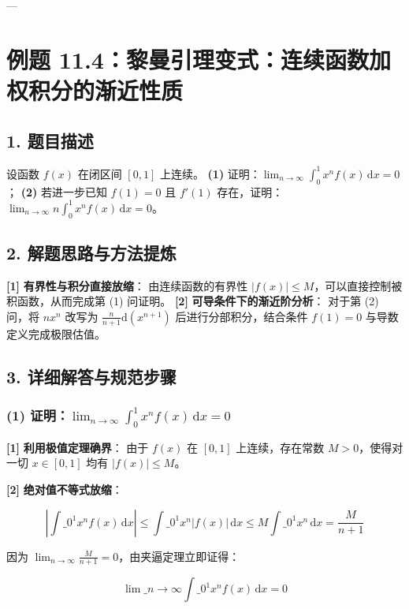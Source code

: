 \documentclass[11pt,a4paper,UTF8]{ctexart}
\begin{document}
---


\section{例题 11.4：黎曼引理变式：连续函数加权积分的渐近性质}


\subsection{1. 题目描述}
设函数 $f(x)$ 在闭区间 $[0, 1]$ 上连续。
\textbf{(1)}  证明：$\lim_{n \to \infty} \int_0^1 x^n f(x)\,\mathrm{d}x = 0$；
\textbf{(2)}  若进一步已知 $f(1) = 0$ 且 $f'(1)$ 存在，证明：$\lim_{n \to \infty} n \int_0^1 x^n f(x)\,\mathrm{d}x = 0$。


\subsection{2. 解题思路与方法提炼}
\begin{solbox}[分步推导与答题规范]
\textbf{[1]}  \textbf{有界性与积分直接放缩}：
由连续函数的有界性 $|f(x)| \le M$，可以直接控制被积函数，从而完成第 (1) 问证明。
\textbf{[2]}  \textbf{可导条件下的渐近阶分析}：
对于第 (2) 问，将 $n x^n$ 改写为 $\frac{n}{n+1}\mathrm{d}(x^{n+1})$ 后进行分部积分，结合条件 $f(1)=0$ 与导数定义完成极限估值。
\end{solbox}


\subsection{3. 详细解答与规范步骤}


\subsubsection{(1) 证明：$\lim_{n \to \infty} \int_0^1 x^n f(x)\,\mathrm{d}x = 0$}
\begin{solbox}[分步推导与答题规范]
\textbf{[1]}  \textbf{利用极值定理确界}：
由于 $f(x)$ 在 $[0, 1]$ 上连续，存在常数 $M > 0$，使得对一切 $x \in [0, 1]$ 均有 $|f(x)| \le M$。

\textbf{[2]}  \textbf{绝对值不等式放缩}：

\begin{equation*}
\left| \int\_0^1 x^n f(x)\,\mathrm{d}x \right| \le \int\_0^1 x^n |f(x)|\,\mathrm{d}x \le M \int\_0^1 x^n\,\mathrm{d}x = \frac{M}{n+1}
\end{equation*}

因为 $\lim_{n \to \infty} \frac{M}{n+1} = 0$，由夹逼定理立即证得：

\begin{equation*}
\lim\_{n \to \infty} \int\_0^1 x^n f(x)\,\mathrm{d}x = 0
\end{equation*}

\end{solbox}
\end{document}
